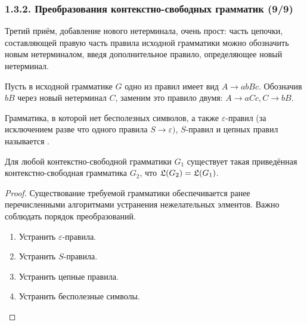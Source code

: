 \begin{frame}
\frametitle{1.3.2. Преобразования контекстно-свободных грамматик (9/9)}
 
Третий приём, добавление нового нетерминала, очень прост: 
часть цепочки, составляющей правую  часть  правила  исходной грамматики можно обозначить новым нетерминалом, введя дополнительное правило, определяющее  новый  нетерминал.

\begin{example} Пусть в исходной грамматике $G$ одно из  правил  имеет вид $A \rightarrow abBc$.  Обозначив $bB$ через новый  нетерминал  $C$,  заменим это правило двумя:  $A \rightarrow aCc, C \rightarrow bB$.
\end{example}


Грамматика, в которой нет бесполезных символов,
а также $\varepsilon$-правил
(за исключением разве что одного правила 
$S\to\varepsilon)$, $S$-правил и цепных правил 
называется
.

\begin{theorem}
Для любой контекстно-свободной грамматики $G_1$
существует такая приведённая контекстно-свободная грамматика $G_2$,
что  $\frak{L}(G_2)=\frak{L}(G_1)$.
\end{theorem}

\begin{proof}
Существование требуемой грамматики
обеспечивается ранее перечисленными алгоритмами
устранения нежелательных элментов.
Важно соблюдать порядок преобразований. 
\begin{enumerate}
\item Устранить $\varepsilon$-правила.
\item Устранить $S$-правила.
\item Устранить цепные правила.
\item Устранить бесполезные символы. 
\end{enumerate}
\end{proof}


\end{frame}

